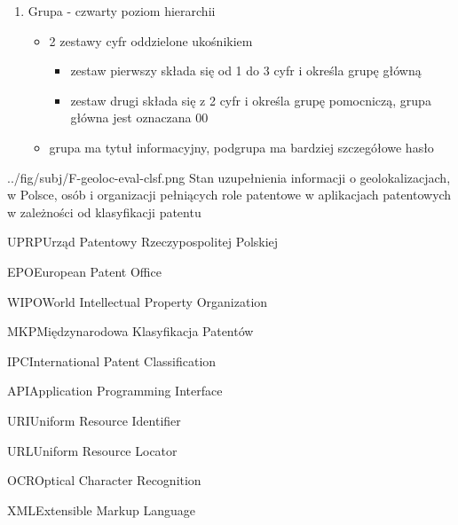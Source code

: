 \begin{enumerate}
\item Grupa - czwarty poziom hierarchii

  \begin{itemize}
\item 2 zestawy cyfr oddzielone ukośnikiem

  \begin{itemize}
\item zestaw pierwszy składa się od 1 do 3 cyfr i określa grupę główną
\item zestaw drugi składa się z 2 cyfr i określa grupę pomocniczą, grupa główna jest oznaczana 00
\end{itemize}

\item grupa ma tytuł informacyjny, podgrupa ma bardziej szczegółowe hasło
\end{itemize}

\end{enumerate}




\figside
{../fig/subj/F-geoloc-eval-clsf.png}
{ Stan uzupełnienia informacji o geolokalizacjach, w Polsce, 
  osób i organizacji pełniących role patentowe
  w aplikacjach patentowych w zależności od klasyfikacji patentu}




  \newpage\begin{acronym}

\acro
{UPRP}{Urząd Patentowy Rzeczypospolitej Polskiej}

\acro
{EPO}{European Patent Office}

\acro
{WIPO}{World Intellectual Property Organization}

\acro
{MKP}{Międzynarodowa Klasyfikacja Patentów}

\acro
{IPC}{International Patent Classification}

\acro
{API}{Application Programming Interface}

\acro
{URI}{Uniform Resource Identifier}

\acro
{URL}{Uniform Resource Locator}

\acro
{OCR}{Optical Character Recognition}

\acro
{XML}{Extensible Markup Language}

\end{acronym}